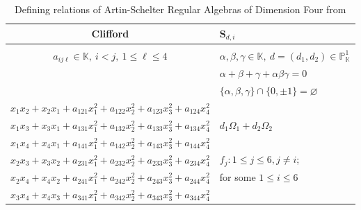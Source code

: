 \documentclass{amsart}
\begin{document}
\begin{table}[H]
{\begin{tabular}{|l|l|l|}
\hline \hline
\multicolumn{2}{|c|}{\textbf{Clifford}} & $\textbf{S}_{d,i}$ \\
\hline \hline
\multicolumn{2}{|c|}{\cite[Section 1.1]{10.1112/jlms/jdp057}} & \cite[Equation 6.1.4]{Davies_2016,ExoticElliptic}\\ \hline
\multicolumn{2}{|c|}{\small $a_{ij\ell} \in \mathbb{K},\ i<j,\ 1 \le \ell \le 4$} & 
\small $\alpha, \beta, \gamma \in \mathbb{K},\ d = (d_1, d_2) \in \mathbb{P}^1_\mathbb{K}$ \\
\multicolumn{2}{|c|}{} & \small $\alpha + \beta + \gamma + \alpha\beta\gamma = 0$ \\
\multicolumn{2}{|c|}{} & \small $\{\alpha, \beta, \gamma\} \cap \{0, \pm 1\} = \varnothing$ \\
\hline
\multicolumn{2}{|c|}{$x_1x_2+x_2x_1 + a_{121}x_1^2 + a_{122}x_2^2 + a_{123}x_3^2 + a_{124}x_4^2$} &  \\
\multicolumn{2}{|c|}{$x_1x_3+x_3x_1 + a_{131}x_1^2 + a_{132}x_2^2 + a_{133}x_3^2 + a_{134}x_4^2$} & $d_1 \Omega_1 + d_2 \Omega_2$ \\
\multicolumn{2}{|c|}{$x_1x_4+x_4x_1 + a_{141}x_1^2 + a_{142}x_2^2 + a_{143}x_3^2 + a_{144}x_4^2$} &  \\
\multicolumn{2}{|c|}{$x_2x_3+x_3x_2 + a_{231}x_1^2 + a_{232}x_2^2 + a_{233}x_3^2 + a_{234}x_4^2$} & $f_j: 1 \le j \le 6, j \neq i$; \\
\multicolumn{2}{|c|}{$x_2x_4+x_4x_2 + a_{241}x_1^2 + a_{242}x_2^2 + a_{243}x_3^2 + a_{244}x_4^2$} & for some $1 \le i \le 6$ \\
\multicolumn{2}{|c|}{$x_3x_4+x_4x_3 + a_{341}x_1^2 + a_{342}x_2^2 + a_{343}x_3^2 + a_{344}x_4^2$} &  \\
\hline
\end{tabular}}
\caption{Defining relations of Artin-Schelter Regular Algebras of
Dimension Four from  \cite{DBLP:journals/jlms/CassidyV14, 10.1112/jlms/jdp057, Pym2013PoissonSA, Smith1992, CerveauLinsNeto1996, Davies_2016, ExoticElliptic, LECOUTRE_2017}}
\end{table}
\end{document}
